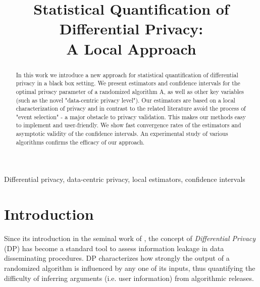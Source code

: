 \documentclass[conference]{IEEEtran}
\begin{document}
\title{Statistical Quantification of Differential Privacy: \\A Local Approach}




\author{
\and
{}
\and
{}
}


\maketitle

\begin{abstract}
In this work we introduce a new approach for statistical quantification of differential privacy in a black box setting. We present estimators and confidence intervals for the optimal privacy parameter of a randomized algorithm A, as well as other key variables (such as the novel "data-centric privacy level"). Our estimators are based on a local characterization of privacy and in contrast to the related literature avoid the process of "event selection" - a major obstacle to privacy validation. 
This makes our methods easy to implement and user-friendly. We show fast convergence rates of the estimators and asymptotic validity of the confidence intervals. An experimental study of various algorithms confirms the efficacy of our approach.
\end{abstract}


\begin{IEEEkeywords}
Differential privacy, data-centric privacy, local estimators, confidence intervals
\end{IEEEkeywords}



\section{Introduction}


Since its introduction in the seminal work of \cite{Dwork2006}, the concept of \textit{Differential Privacy} (DP) has become a standard tool to assess information leakage in data disseminating procedures. DP characterizes how strongly the output of a randomized algorithm is influenced by any one of its inputs, thus quantifying the difficulty of inferring arguments (i.e. user information) from algorithmic releases. 
\end{document}
